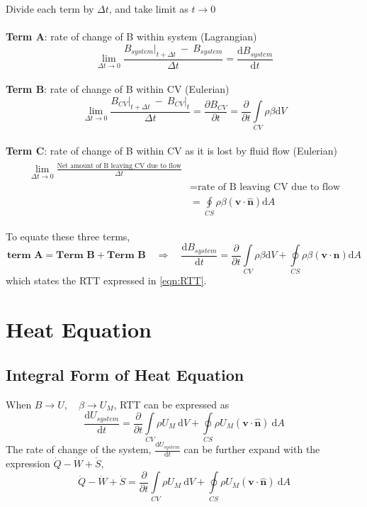 \documentclass[12pt, a4paper]{article}
\begin{document}
\begin{tcolorbox}[breakable, title = Derivation]
Divide each term by $\Delta t$, and take limit as $t \to 0$\\
\\ \textbf{Term A}: rate of change of B within system (Lagrangian)
\[ 
    \lim_{\Delta t \to 0}\frac{B_{system} \lvert_{t + \Delta t} \ -\ B_{system}}{\Delta t} = \frac{\mathrm{d}B_{system}}{\mathrm{d}t} 
\]
\\ 
\textbf{Term B}: rate of change of B within CV (Eulerian)
\[
    \lim_{\Delta t \to 0} \frac{B_{CV} \lvert_{t + \Delta t} \ -\  B_{CV}  \lvert_{t}}{\Delta t} = \frac{\partial B_{CV}}{\partial t} = \frac{\partial}{\partial t} \int\limits_{CV} \rho \beta \mathrm{d}V
\]
 \\ 
\textbf{Term C}: rate of change of B within CV as it is lost by fluid flow (Eulerian)
\begin{align*} 
\begin{split}
    \lim_{\Delta t \to 0} \frac{\text{Net amount of B leaving CV due to flow}}{\Delta t} \\
    & = \text{rate of B leaving CV due to flow}\\
    & = \oint\limits_{CS} \rho \beta (\bm{v} \cdot \bm{\hat{n}})\mathrm{d}A 
\end{split}
\end{align*}

To equate these three terms,
\[
    \textbf{term A} = \textbf{Term B} + \textbf{Term B}
    \quad \Rightarrow \quad
    \frac{\mathrm{d}B_{system}}{\mathrm{d}t} 
    = \frac{\partial}{\partial t} \int\limits_{CV} \rho \beta \mathrm{d}V 
    + \oint\limits_{CS} \rho \beta (\bm{v} \cdot \bm{n})\mathrm{d}A 
\]
which states the RTT expressed in \autoref{eqn:RTT}.
\end{tcolorbox}

\newpage
\section{Heat Equation}
\subsection{Integral Form of Heat Equation}
When $B \to U, \quad \beta \to U_{M}$, RTT can be expressed as
\[
    \frac{\mathrm{d}U_{system}}{\mathrm{d}t} = \frac{\partial}{\partial t} \int\limits_{CV} \rho U_{M} \ \mathrm{d}V +  \oint\limits_{CS} \rho U_{M} (\bm{v} \cdot \bm{\hat{n}}) \ \mathrm{d}A
\]
The rate of change of the system, $\frac{\mathrm{d}U_{system}}{\mathrm{d}t}$ can be further expand with the expression $\dot{Q}-\dot{W}+\dot{S}$,
\[
  \dot{Q}-\dot{W}+\dot{S} = \frac{\partial}{\partial t} \int\limits_{CV} \rho U_{M} \ \mathrm{d}V +  \oint\limits_{CS} \rho U_{M} (\bm{v} \cdot \bm{\hat{n}}) \ \mathrm{d}A
\]
\end{document}
